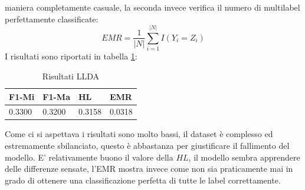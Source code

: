 \documentclass[technote]{IEEEtran}
\begin{document}
maniera completamente casuale, la seconda invece verifica il numero
di multilabel perfettamente classificate:\\
\begin{equation}
EMR = \frac{1}{|N|}\sum_{i=1}^{|N|}I(Y_i = Z_i)
\end{equation}
I risultati sono riportati in tabella \ref{t_res_llda}:\\
\begin{table}[H]
\centering
\caption{Risultati LLDA}
\begin{tabular}{|l|l|l|l|}
\hline
\textbf{F1-Mi} & \textbf{F1-Ma} & \textbf{HL} & \textbf{EMR} \\ \hline
0.3300         & 0.3200         & 0.3158      & 0.0318       \\ \hline
\end{tabular}
\label{t_res_llda}
\end{table}
Come ci si aspettava i risultati sono molto bassi, il dataset è complesso ed estremamente sbilanciato, questo è abbastanza per giustificare il fallimento del modello. E' relativamente buono il valore della $ HL $, il modello sembra apprendere delle differenze sensate, l'EMR mostra invece come non sia praticamente mai in grado di ottenere una classificazione perfetta di tutte le label correttamente.
\end{document}
